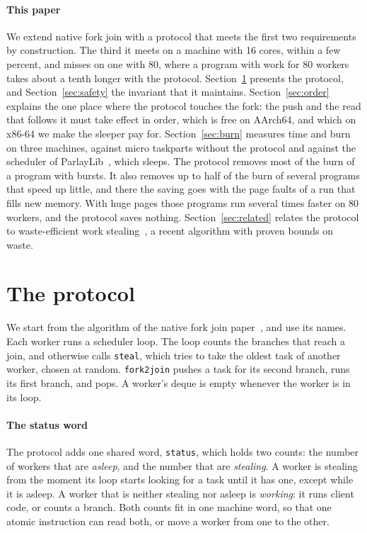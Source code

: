 \documentclass[sigplan,nonacm]{acmart}
\begin{document}
\paragraph{This paper}
%
We extend native fork join with a protocol that meets the first two
requirements by construction.
%
The third it meets on a machine with 16 cores, within a few percent,
and misses on one with 80, where a program with work for 80 workers
takes about a tenth longer with the protocol.
%
Section~\ref{sec:protocol} presents the protocol, and
Section~\ref{sec:safety} the invariant that it maintains.
%
Section~\ref{sec:order} explains the one place where the protocol
touches the fork: the push and the read that follows it must take
effect in order, which is free on AArch64, and which on x86-64 we make
the sleeper pay for.
%
Section~\ref{sec:burn} measures time and burn on three machines,
against micro taskparts without the protocol and against the scheduler
of ParlayLib~\cite{blelloch20parlaylib}, which sleeps.
%
The protocol removes most of the burn of a program with bursts.
%
It also removes up to half of the burn of several programs that speed
up little, and there the saving goes with the page faults of a run
that fills new memory.
%
With huge pages those programs run several times faster on 80
workers, and the protocol saves nothing.
%
Section~\ref{sec:related} relates the protocol to waste-efficient work
stealing~\cite{singer2026wews}, a recent algorithm with proven bounds
on waste.

\section{The protocol}
\label{sec:protocol}

We start from the algorithm of the native fork join
paper~\cite{nativeforkjoin}, and use its names.
%
Each worker runs a scheduler loop.
%
The loop counts the branches that reach a join, and otherwise calls
\lstinline|steal|, which tries to take the oldest task of another
worker, chosen at random.
%
\lstinline|fork2join| pushes a task for its second branch, runs its
first branch, and pops.
%
A worker's deque is empty whenever the worker is in its loop.

\paragraph{The status word}
%
The protocol adds one shared word, \lstinline|status|, which holds two
counts: the number of workers that are \emph{asleep}, and the number
that are \emph{stealing}.
%
A worker is stealing from the moment its loop starts looking for a
task until it has one, except while it is asleep.
%
A worker that is neither stealing nor asleep is \emph{working}: it
runs client code, or counts a branch.
%
Both counts fit in one machine word, so that one atomic instruction
can read both, or move a worker from one to the other.
\end{document}
